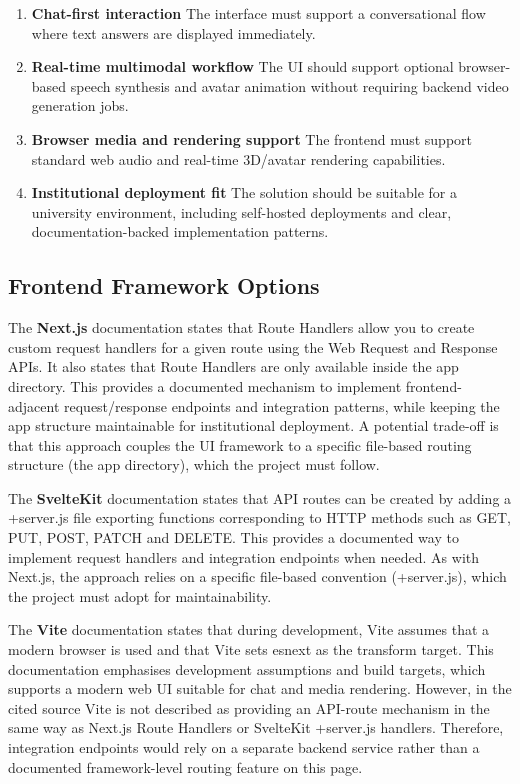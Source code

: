 \begin{enumerate}
    \item \textbf{Chat-first interaction}
    The interface must support a conversational flow where text answers are displayed immediately.
    \item \textbf{Real-time multimodal workflow}
    The UI should support optional browser-based speech synthesis and avatar animation without requiring backend video generation jobs.
    \item \textbf{Browser media and rendering support}
    The frontend must support standard web audio and real-time 3D/avatar rendering capabilities.
    \item \textbf{Institutional deployment fit}
    The solution should be suitable for a university environment, including self-hosted deployments and clear, documentation-backed implementation patterns.
\end{enumerate}

\subsection{Frontend Framework Options}

The \textbf{Next.js} documentation states that Route Handlers allow you to create custom request handlers for a given route using the Web Request and Response APIs. It also states that Route Handlers are only available inside the app directory. This provides a documented mechanism to implement frontend-adjacent request/response endpoints and integration patterns, while keeping the app structure maintainable for institutional deployment. A potential trade-off is that this approach couples the UI framework to a specific file-based routing structure (the app directory), which the project must follow. \parencite{GettingS41:online}

The \textbf{SvelteKit} documentation states that API routes can be created by adding a +server.js file exporting functions corresponding to HTTP methods such as GET, PUT, POST, PATCH and DELETE. This provides a documented way to implement request handlers and integration endpoints when needed. As with Next.js, the approach relies on a specific file-based convention (+server.js), which the project must adopt for maintainability. \parencite{DocsSve12:online}

The \textbf{Vite} documentation states that during development, Vite assumes that a modern browser is used and that Vite sets esnext as the transform target. This documentation emphasises development assumptions and build targets, which supports a modern web UI suitable for chat and media rendering. However, in the cited source Vite is not described as providing an API-route mechanism in the same way as Next.js Route Handlers or SvelteKit +server.js handlers. Therefore, integration endpoints would rely on a separate backend service rather than a documented framework-level routing feature on this page. \parencite{GettingS68:online}


